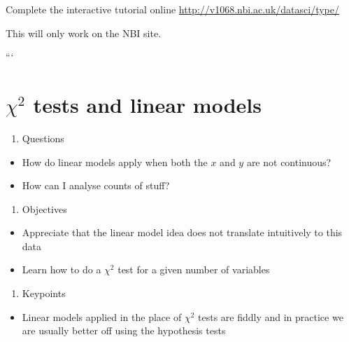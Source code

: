 \documentclass[
]{book}
\providecommand{\tightlist}{%
  \setlength{\itemsep}{0pt}\setlength{\parskip}{0pt}}
\newenvironment{task}
{ \begin{tcolorbox}[title=For you to do,title filled] }
{  \end{tcolorbox} }
\begin{document}
\begin{task}
\end{task}
\begin{task}
Complete the interactive tutorial online \url{http://v1068.nbi.ac.uk/datasci/type/}

This will only work on the NBI site.
\end{task}
```

\hypertarget{chi-2-tests-and-linear-models}{%
\chapter{\texorpdfstring{\(\chi ^2\) tests and linear models}{\textbackslash chi \^{}2 tests and linear models}}\label{chi-2-tests-and-linear-models}}

\begin{enumerate}
\def\labelenumi{\arabic{enumi}.}
\tightlist
\item
  Questions
\end{enumerate}

\begin{itemize}
\tightlist
\item
  How do linear models apply when both the \(x\) and \(y\) are not continuous?
\item
  How can I analyse counts of stuff?
\end{itemize}

\begin{enumerate}
\def\labelenumi{\arabic{enumi}.}
\setcounter{enumi}{1}
\tightlist
\item
  Objectives
\end{enumerate}

\begin{itemize}
\tightlist
\item
  Appreciate that the linear model idea does not translate intuitively to this data
\item
  Learn how to do a \(\chi^2\) test for a given number of variables
\end{itemize}

\begin{enumerate}
\def\labelenumi{\arabic{enumi}.}
\setcounter{enumi}{2}
\tightlist
\item
  Keypoints
\end{enumerate}

\begin{itemize}
\tightlist
\item
  Linear models applied in the place of \(\chi^2\) tests are fiddly and in practice we are usually better off using the hypothesis tests
\end{itemize}
\end{document}
